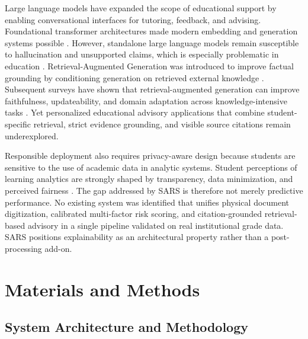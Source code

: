 \documentclass{article}
\begin{document}
Large language models have expanded the scope of educational support by enabling conversational interfaces for tutoring, feedback, and advising. Foundational transformer architectures made modern embedding and generation systems possible \cite{vaswani2017attention,brown2020language}. However, standalone large language models remain susceptible to hallucination and unsupported claims, which is especially problematic in education \cite{kasneci2023chatgpt}. Retrieval-Augmented Generation was introduced to improve factual grounding by conditioning generation on retrieved external knowledge \cite{lewis2020rag}. Subsequent surveys have shown that retrieval-augmented generation can improve faithfulness, updateability, and domain adaptation across knowledge-intensive tasks \cite{gao2023rag}. Yet personalized educational advisory applications that combine student-specific retrieval, strict evidence grounding, and visible source citations remain underexplored.

Responsible deployment also requires privacy-aware design because students are sensitive to the use of academic data in analytic systems. Student perceptions of learning analytics are strongly shaped by transparency, data minimization, and perceived fairness \cite{ifenthaler2016privacy}. The gap addressed by SARS is therefore not merely predictive performance. No existing system was identified that unifies physical document digitization, calibrated multi-factor risk scoring, and citation-grounded retrieval-based advisory in a single pipeline validated on real institutional grade data. SARS positions explainability as an architectural property rather than a post-processing add-on.

\section{Materials and Methods}
\subsection{System Architecture and Methodology}
\end{document}
